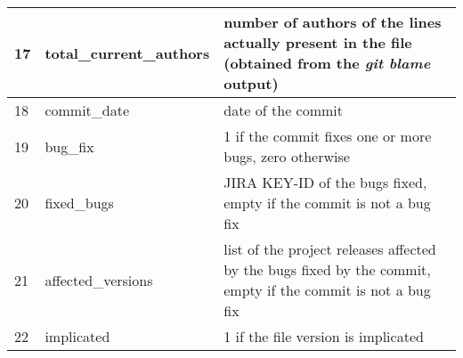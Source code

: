 \begin{table*}[ht]
\begin{tabular}{|l|l|p{}|}
17 & total\_current\_authors & 
    number of authors of the lines actually present in the file (obtained from the \textit{git blame} output)\\\hline
18 & commit\_date & date of the commit\\ \hline
19 & bug\_fix & 1 if the commit fixes one or more bugs, zero otherwise\\ \hline
20 & fixed\_bugs & JIRA KEY-ID of the bugs fixed, empty if the commit is not a bug fix\\ \hline
21 & affected\_versions & list of the project releases affected by the bugs fixed by the commit, empty if the commit is not a bug fix\\ \hline
22 & implicated & 1 if the file version is implicated \\ \hline
\end{tabular}
\end{table*}
